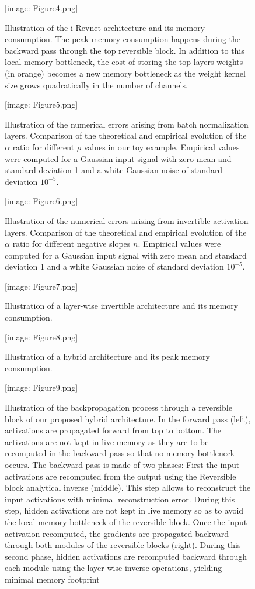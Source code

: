 \documentclass[twocolumn]{bmcart}
\def\texttt{[image: ]}
\begin{document}
\begin{backmatter}
\begin{figure}[t]
\texttt{[image: Figure4.png]}
\caption{
Illustration of the i-Revnet architecture and its memory consumption.
The peak memory consumption happens during the backward pass through the top reversible block.
In addition to this local memory bottleneck, the cost of storing the top layers weights
(in orange) becomes a new memory bottleneck as the
weight kernel size grows quadratically in the number of channels.
}
\end{figure}


\begin{figure}[t]
\texttt{[image: Figure5.png]}
\caption{
Illustration of the numerical errors arising from batch normalization layers.
Comparison of the theoretical and empirical evolution of the $\alpha$ ratio for different $\rho$ values in our toy example.
Empirical values were computed for a Gaussian input signal with zero mean and standard deviation 1 and a white Gaussian noise of standard deviation $10^{-5}$.
}
\end{figure}

\begin{figure}[t]
\texttt{[image: Figure6.png]}
\caption{
Illustration of the numerical errors arising from invertible activation layers.
Comparison of the theoretical and empirical evolution of the $\alpha$ ratio for different negative slopes $n$.
Empirical values were computed for a Gaussian input signal with zero mean and standard deviation 1 and a white Gaussian noise of standard deviation $10^{-5}$.
}
\end{figure}
\begin{figure}[t]
\texttt{[image: Figure7.png]}
\caption{
Illustration of a layer-wise invertible architecture and its memory consumption.
}
\end{figure}

\begin{figure}[t]
\texttt{[image: Figure8.png]}
\caption{
Illustration of a hybrid architecture and its peak memory consumption.
}
\end{figure}

\begin{figure}[t]
\texttt{[image: Figure9.png]}
\caption{
Illustration of the backpropagation process through a reversible block of our proposed hybrid architecture.
In the forward pass (left), activations are propagated forward from top to bottom.
The activations are not kept in live memory as they are to be recomputed in the backward pass so that no memory bottleneck occurs.
The backward pass is made of two phases:
First the input activations are recomputed from the output using the Reversible block analytical inverse (middle).
This step allows to reconstruct the input activations with minimal reconstruction error.
During this step, hidden activations are not kept in live memory so as to avoid the local memory bottleneck of the reversible block.
Once the input activation recomputed, the gradients are propagated backward through both modules of the reversible blocks (right).
During this second phase, hidden activations are recomputed backward through each module using the layer-wise inverse operations, yielding minimal memory footprint
}
\end{figure}


\end{backmatter}
\end{document}
